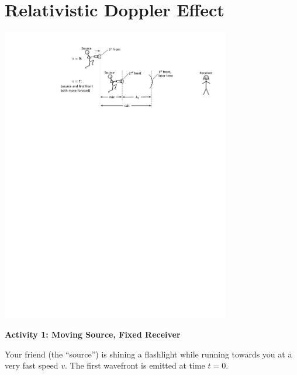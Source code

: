 \section{Relativistic Doppler Effect}

\makelabheader %

\begin{center}
\includegraphics[width=0.75\textwidth]{relativistic_doppler/relativistic_front_motion.pdf}
\end{center}

\textbf{Activity 1: Moving Source, Fixed Receiver}

Your friend (the ``source'') is shining a flashlight while running towards you at a very fast speed $v$.  The first wavefront is emitted at time $t=0$.


